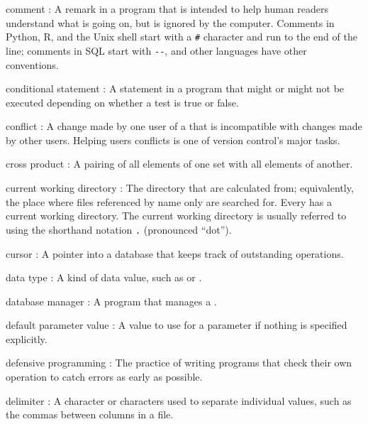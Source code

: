 \documentclass{book}
\begin{document}
\begin{swcdescription}
\item[comment]:
A remark in a program that is intended to help human
readers understand what is going on, but is ignored by the computer.
Comments in Python, R, and the Unix shell start with a \texttt{\#}
character and run to the end of the line; comments in SQL start with
\texttt{-{}-}, and other languages have other conventions.

\item[conditional statement]:
A statement in a program that might or
might not be executed depending on whether a test is true or false.

\item[conflict]:
A change made by one user of a
 that is
incompatible with changes made by other users. Helping users
 conflicts is one of version control's
major tasks.

\item[cross product]:
A pairing of all elements of one set with all
elements of another.

\item[current working directory]:
The directory that
 are calculated from;
equivalently, the place where files referenced by name only are searched
for. Every  has a current working
directory. The current working directory is usually referred to using
the shorthand notation \texttt{.} (pronounced ``dot'').

\item[cursor]:
A pointer into a database that keeps track of
outstanding operations.

\item[data type]:
A kind of data value, such as
 or .

\item[database manager]:
A program that manages a
.

\item[default parameter value]:
A value to use for a parameter if
nothing is specified explicitly.

\item[defensive programming]:
The practice of writing programs that
check their own operation to catch errors as early as possible.

\item[delimiter]:
A character or characters used to separate
individual values, such as the commas between columns in a
 file.


\end{swcdescription}
\end{document}
